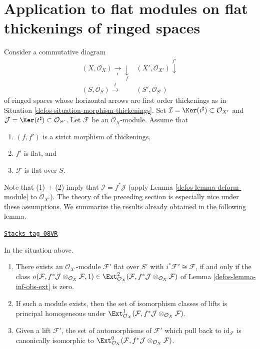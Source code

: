 \section{Application to flat modules on flat thickenings of ringed spaces}
\label{defos-section-flat}
Consider a commutative diagram
$$
\begin{array}{cc}(X, \mathcal{O}_X) \underset{i}{\longrightarrow}\underset{f}{\downarrow} & (X', \mathcal{O}_{X'}) \overset{f'}{\downarrow} \\ (S, \mathcal{O}_S) \overset{t}{\longrightarrow} & (S', \mathcal{O}_{S'})\end{array}
$$
of ringed spaces whose horizontal arrows are first order thickenings as in
Situation \ref{defos-situation-morphism-thickenings}. Set
$\mathcal{I} = \Ker(i^\sharp) \subset \mathcal{O}_{X'}$ and
$\mathcal{J} = \Ker(t^\sharp) \subset \mathcal{O}_{S'}$.
Let $\mathcal{F}$ be an $\mathcal{O}_X$-module. Assume that
\begin{enumerate}
\item $(f, f')$ is a strict morphism of thickenings,
\item $f'$ is flat, and
\item $\mathcal{F}$ is flat over $S$.
\end{enumerate}
Note that (1) $+$ (2) imply that $\mathcal{I} = f^*\mathcal{J}$
(apply Lemma \ref{defos-lemma-deform-module} to $\mathcal{O}_{X'}$).
The theory of the preceding section is especially nice
under these assumptions. We summarize the results already obtained
in the following lemma.

\begin{lemma}[Flat]
\label{defos-lemma-flat}
\href{https://stacks.math.columbia.edu/tag/08VR}{\texttt{Stacks tag 08VR}}

In the situation above.
\begin{enumerate}
\item There exists an $\mathcal{O}_{X'}$-module $\mathcal{F}'$ flat over
$S'$ with $i^*\mathcal{F}' \cong \mathcal{F}$, if and only if
the class
$o(\mathcal{F}, f^*\mathcal{J} \otimes_{\mathcal{O}_X} \mathcal{F}, 1)
\in \Ext^2_{\mathcal{O}_X}(
\mathcal{F}, f^*\mathcal{J} \otimes_{\mathcal{O}_X} \mathcal{F})$
of Lemma \ref{defos-lemma-inf-obs-ext} is zero.
\item If such a module exists, then the set of isomorphism classes
of lifts is principal homogeneous under
$\Ext^1_{\mathcal{O}_X}(
\mathcal{F}, f^*\mathcal{J} \otimes_{\mathcal{O}_X} \mathcal{F})$.
\item Given a lift $\mathcal{F}'$, the set of automorphisms of
$\mathcal{F}'$ which pull back to $\text{id}_\mathcal{F}$ is canonically
isomorphic to $\Ext^0_{\mathcal{O}_X}(
\mathcal{F}, f^*\mathcal{J} \otimes_{\mathcal{O}_X} \mathcal{F})$.
\end{enumerate}
\end{lemma}

